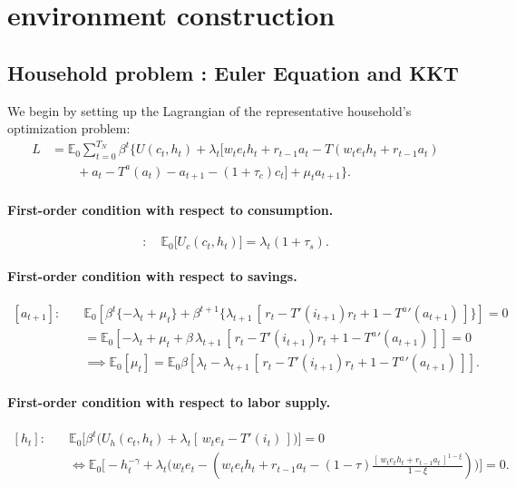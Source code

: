 \documentclass[11pt]{article}
\begin{document}
\section{environment construction}
\subsection{Household problem : Euler Equation and KKT}

We begin by setting up the Lagrangian of the representative household’s optimization problem:
\begin{equation}
\begin{aligned}
L &= \mathbb{E}_0 \sum_{t=0}^{T_N} \beta^t \Big\{ U(c_t,h_t) 
+ \lambda_t \big[ w_t e_t h_t + r_{t-1} a_t - T(w_t e_t h_t + r_{t-1} a_t) \\
&\qquad + a_t - T^a(a_t) - a_{t+1} - (1+\tau_c)c_t \big] 
+ \mu_t a_{t+1} \Big\}.
\end{aligned}
\end{equation}

\paragraph{First-order condition with respect to consumption.}
\begin{equation}
[c_t]: \quad \mathbb{E}_0 \big[ U_c(c_t,h_t) \big] 
= \lambda_t (1+\tau_s).
\end{equation}

\paragraph{First-order condition with respect to savings.}
\begin{equation}
\begin{aligned}
[a_{t+1}]:\quad &
\mathbb{E}_0 \!\left[ \beta^t \{-\lambda_t + \mu_t\} 
+ \beta^{t+1} \big\{ \lambda_{t+1}\,[\,r_t - T'(i_{t+1})r_t + 1 - {T^a}'(a_{t+1})\,] \big\} \right] = 0 \\
&= \mathbb{E}_0 \!\left[ -\lambda_t + \mu_t 
+ \beta \,\lambda_{t+1}\,[\,r_t - T'(i_{t+1})r_t + 1 - {T^a}'(a_{t+1})\,] \right] = 0 \\
&\implies \mathbb{E}_0[\mu_t] 
= \mathbb{E}_0 \beta \!\left[ \lambda_t 
- \lambda_{t+1}\,[\,r_t - T'(i_{t+1})r_t + 1 - {T^a}'(a_{t+1})\,] \right].
\end{aligned}
\end{equation}

\paragraph{First-order condition with respect to labor supply.}
\begin{equation}
\begin{aligned}
[h_t]: \quad &
\mathbb{E}_0 \Big[ \beta^t \big( U_h(c_t,h_t) + \lambda_t[\,w_t e_t - T'(i_t)\,] \big) \Big] = 0 \\
&\iff \mathbb{E}_0 \Big[ -h_t^{-\gamma} 
+ \lambda_t \big( w_t e_t 
- (w_t e_t h_t + r_{t-1}a_t 
- (1-\tau)\tfrac{[\,w_t e_t h_t + r_{t-1}a_t\,]^{1-\xi}}{1-\xi}) \big) \Big] = 0.
\end{aligned}
\end{equation}
\end{document}
